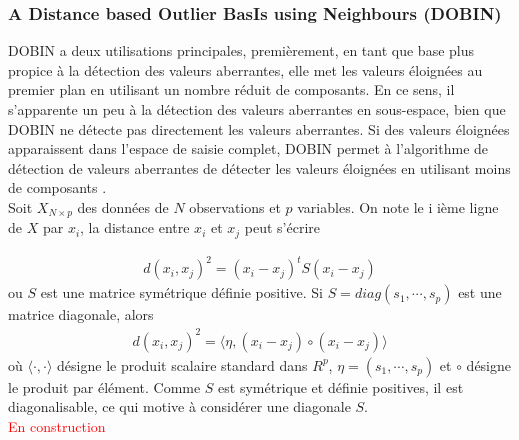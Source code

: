 \subsubsection*{A Distance based Outlier BasIs using Neighbours (DOBIN)}
 DOBIN a deux utilisations principales,  premièrement, en tant que base plus propice à la détection des valeurs aberrantes, elle met les valeurs éloignées au premier plan en utilisant un nombre réduit de composants. En ce sens, il s’apparente un peu à la détection des valeurs aberrantes en sous-espace, bien que DOBIN ne détecte pas directement les valeurs aberrantes. Si des valeurs éloignées apparaissent dans l’espace de saisie complet, DOBIN permet à l'algorithme de détection de valeurs aberrantes de détecter les valeurs éloignées en utilisant moins de composants \cite{A7}.  \\
 Soit  $X_{N\times p}$ des données de  $N$ observations et $p$ variables.
 On note le i ième ligne de $X$ par $x_i$, la distance entre  $x_i$ et $x_j$ peut s'écrire
 
 \begin{align*}
 d(x_i,x_j)^2=(x_i-x_j)^tS(x_i-x_j) 
 \end{align*}
 ou $S$ est une matrice symétrique définie positive. Si $S=diag(s_1,\cdots,s_p)$ est une matrice diagonale, alors
 \begin{align*}
 d(x_i,x_j)^2=\langle\eta,(x_i-x_j)\circ(x_i-x_j) \rangle
 \end{align*} 
 où $\langle\cdot{,}\cdot\rangle$ désigne le produit scalaire  standard dans $R^p$, $\eta = (s_1,\cdots,s_p)$ et $\circ$ désigne le produit par élément. Comme $S$ est symétrique et définie positives, il est diagonalisable, ce qui motive à considérer une diagonale $S$.\\
 \textcolor{red}{En construction}\\
% 
%
